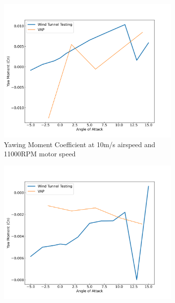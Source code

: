 \begin{figure}[H]
    \centering
    \begin{subfigure}[b]{0.467\textwidth}
        \centering
        \includegraphics[width=\textwidth]{05_Results/VAP/tractor/Cn/10ms_11000RPM_Cn.png}
        \caption{Yawing Moment Coefficient at 10m/s airspeed and 11000RPM motor speed}
        \label{fig:VAP_tractor_10ms_11000}
    \end{subfigure}
    \begin{subfigure}[b]{0.467\textwidth}
        \centering
        \includegraphics[width=\textwidth]{05_Results/VAP/tractor/Cn/20ms_6000RPM_Cn.png}

\end{subfigure}
\end{figure}
